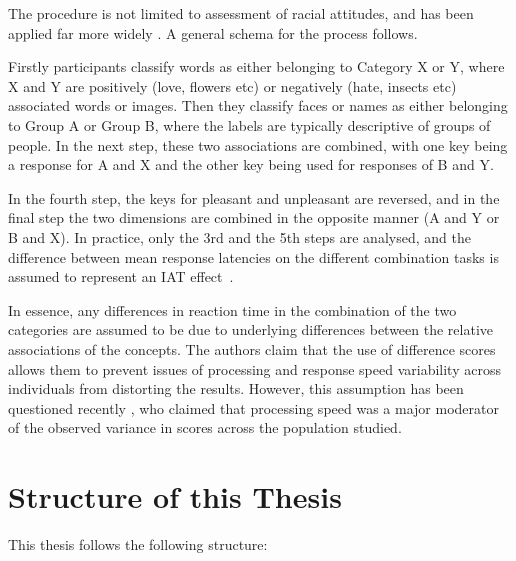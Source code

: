 The procedure is not limited to assessment of racial attitudes, and has been applied far more widely \cite{Craeynest2008,Greenwald2009, Schmukle2008,Walker2008}.  A general schema for the process follows.   

Firstly participants classify words as either belonging to Category X or Y, where X and Y are positively (love, flowers etc) or negatively (hate, insects etc) associated words or images.  Then they classify faces or names as either belonging to Group A or Group B, where the labels are typically descriptive of groups of people.  In the next step, these two associations are combined, with one key being a response for A and X and the other key being used for responses of B and Y. 

In the fourth step, the keys for pleasant and unpleasant are reversed, and in the final step the two dimensions are combined in the opposite manner (A and Y or B and X). In practice, only the 3rd and the 5th steps are analysed, and the difference between mean response latencies on the different combination tasks is assumed to represent an IAT effect~\cite{Greenwald1998}. 

In essence, any differences in reaction time in the combination of the two categories are assumed to be due to underlying differences between the relative associations of the concepts. The authors claim that the use of difference scores allows them to prevent issues of processing and response speed variability across individuals from distorting the results. However, this assumption has been questioned recently \cite{Blanton2006}, who claimed that processing speed was a major moderator of the observed variance in scores across the population studied.  

\section{Structure of this Thesis}
\label{sec:struct-this-thes}



This thesis follows the following structure:

